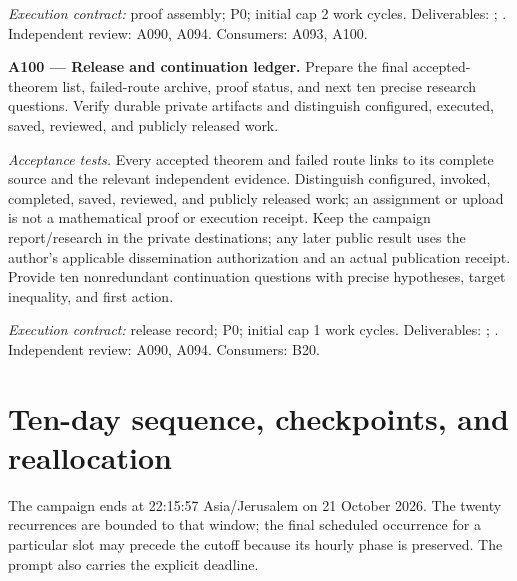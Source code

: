 \documentclass[11pt]{article}
\begin{document}
{\small\emph{Execution contract:} proof assembly; P0; initial cap 2 work cycles. Deliverables: ; . Independent review: A090, A094. Consumers: A093, A100.}

\textbf{A100 --- Release and continuation ledger.} Prepare the final accepted-theorem list, failed-route archive, proof status, and next ten precise research questions. Verify durable private artifacts and distinguish configured, executed, saved, reviewed, and publicly released work.

\emph{Acceptance tests.} Every accepted theorem and failed route links to its complete source and the relevant independent evidence. Distinguish configured, invoked, completed, saved, reviewed, and publicly released work; an assignment or upload is not a mathematical proof or execution receipt. Keep the campaign report/research in the private destinations; any later public result uses the author's applicable dissemination authorization and an actual publication receipt. Provide ten nonredundant continuation questions with precise hypotheses, target inequality, and first action.

{\small\emph{Execution contract:} release record; P0; initial cap 1 work cycles. Deliverables: ; . Independent review: A090, A094. Consumers: B20.}

\section{Ten-day sequence, checkpoints, and reallocation}

The campaign ends at 22:15:57 Asia/Jerusalem on 21 October 2026. The twenty recurrences are bounded to that window; the final scheduled occurrence for a particular slot may precede the cutoff because its hourly phase is preserved. The prompt also carries the explicit deadline.
\end{document}
